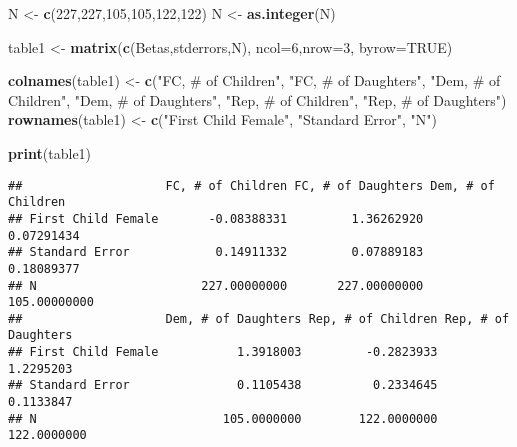 \documentclass[]{article}
\newenvironment{Shaded}{\begin{snugshade}}{\end{snugshade}}
\newcommand{\KeywordTok}[1]{\textcolor[rgb]{0.13,0.29,0.53}{\textbf{#1}}}
\newcommand{\DataTypeTok}[1]{\textcolor[rgb]{0.13,0.29,0.53}{#1}}
\newcommand{\DecValTok}[1]{\textcolor[rgb]{0.00,0.00,0.81}{#1}}
\newcommand{\StringTok}[1]{\textcolor[rgb]{0.31,0.60,0.02}{#1}}
\newcommand{\OtherTok}[1]{\textcolor[rgb]{0.56,0.35,0.01}{#1}}
\newcommand{\NormalTok}[1]{#1}
\begin{document}
\begin{Shaded}
\begin{Highlighting}[]
\NormalTok{N <-}\StringTok{ }\KeywordTok{c}\NormalTok{(}\DecValTok{227}\NormalTok{,}\DecValTok{227}\NormalTok{,}\DecValTok{105}\NormalTok{,}\DecValTok{105}\NormalTok{,}\DecValTok{122}\NormalTok{,}\DecValTok{122}\NormalTok{)}
\NormalTok{N <-}\StringTok{ }\KeywordTok{as.integer}\NormalTok{(N)}

\NormalTok{table1 <-}\StringTok{ }\KeywordTok{matrix}\NormalTok{(}\KeywordTok{c}\NormalTok{(Betas,stderrors,N), }\DataTypeTok{ncol=}\DecValTok{6}\NormalTok{,}\DataTypeTok{nrow=}\DecValTok{3}\NormalTok{, }\DataTypeTok{byrow=}\OtherTok{TRUE}\NormalTok{)}

\KeywordTok{colnames}\NormalTok{(table1) <-}\StringTok{ }\KeywordTok{c}\NormalTok{(}\StringTok{"FC, # of Children"}\NormalTok{, }\StringTok{"FC, # of Daughters"}\NormalTok{, }\StringTok{"Dem, # of Children"}\NormalTok{, }\StringTok{"Dem, # of Daughters"}\NormalTok{, }\StringTok{"Rep, # of Children"}\NormalTok{, }\StringTok{"Rep, # of Daughters"}\NormalTok{)}
\KeywordTok{rownames}\NormalTok{(table1) <-}\StringTok{ }\KeywordTok{c}\NormalTok{(}\StringTok{"First Child Female"}\NormalTok{, }\StringTok{"Standard Error"}\NormalTok{, }\StringTok{"N"}\NormalTok{)}

\KeywordTok{print}\NormalTok{(table1)}
\end{Highlighting}
\end{Shaded}

\begin{verbatim}
##                    FC, # of Children FC, # of Daughters Dem, # of Children
## First Child Female       -0.08388331         1.36262920         0.07291434
## Standard Error            0.14911332         0.07889183         0.18089377
## N                       227.00000000       227.00000000       105.00000000
##                    Dem, # of Daughters Rep, # of Children Rep, # of Daughters
## First Child Female           1.3918003         -0.2823933           1.2295203
## Standard Error               0.1105438          0.2334645           0.1133847
## N                          105.0000000        122.0000000         122.0000000
\end{verbatim}
\end{document}
